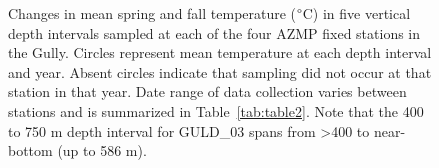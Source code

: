 \documentclass[12pt]{article}\usepackage[]{graphicx}\usepackage[]{color}
\begin{document}
\begin{figure}[htb]

{\centering {} 

}

\caption{Changes in mean spring and fall temperature (\(\degree\)C) in five vertical depth intervals sampled at each of the four AZMP fixed stations in the Gully. Circles represent mean temperature at each depth interval and year. Absent circles indicate that sampling did not occur at that station in that year. Date range of data collection varies between stations and is summarized in Table~\ref{tab:table2}. Note that the 400 to 750 m depth interval for GULD\_03 spans from \textgreater400 to near-bottom (up to 586 m).}\label{fig:figure10}
\end{figure}
\clearpage
\end{document}
